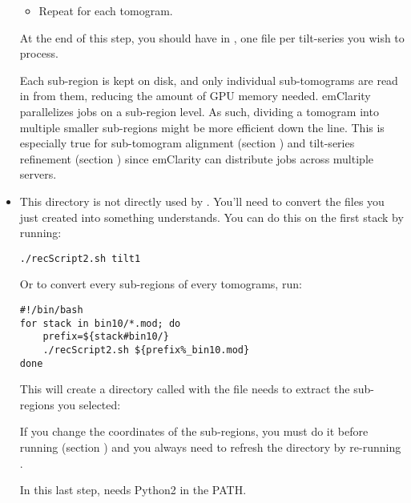 \begin{itemize}
\begin{itemize}
        \item Repeat for each tomogram.
        
    \end{itemize}
    At the end of this step, you should have in , one  file per tilt-series you wish to process.

    \begin{note}Each sub-region is kept on disk, and only individual sub-tomograms are read in from them, reducing the amount of GPU memory needed. emClarity parallelizes jobs on a sub-region level. As such, dividing a tomogram into multiple smaller sub-regions might be more efficient down the line. This is especially true for sub-tomogram alignment (section ) and tilt-series refinement (section ) since emClarity can distribute jobs across multiple servers.
    \end{note}

    \item This  directory is not directly used by {\emClarity}. You'll need to convert the  files you just created into something {\emClarity} understands. You can do this on the first stack by running:
\begin{lstlisting}
./recScript2.sh tilt1
\end{lstlisting}
    Or to convert every sub-regions of every tomograms, run:
\begin{lstlisting}
#!/bin/bash
for stack in bin10/*.mod; do
    prefix=${stack#bin10/}
    ./recScript2.sh ${prefix%_bin10.mod}
done
\end{lstlisting}

    This will create a directory called  with the file {\emClarity} needs to extract the sub-regions you selected:
    

    \begin{note}If you change the coordinates of the sub-regions, you must do it before running  (section ) and you always need to refresh the  directory by re-running .
    \end{note}
    
    \begin{note}In this last step,  needs Python2 in the PATH.
    \end{note}
\end{itemize}
